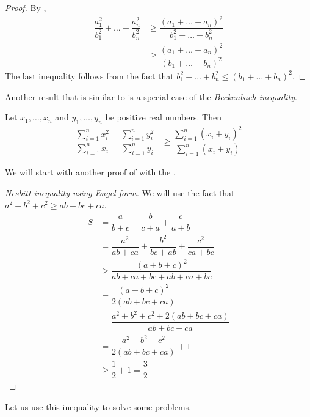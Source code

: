 \documentclass{subfile}
\begin{document}
		\begin{proof}
			By ,
				\begin{align*}
					\dfrac{a_1^2}{b_1^2}+\ldots+\dfrac{a_n^2}{b_n^2}
						& \geq\dfrac{(a_1+\ldots+a_n)^2}{b_1^2+\ldots+b_n^2}\\
						& \geq\dfrac{(a_1+\ldots+a_n)^2}{(b_1+\ldots+b_n)^2}
				\end{align*}
			The last inequality follows from the fact that $b_1^2+\ldots+b_n^2\leq(b_1+\ldots+b_n)^2$.
		\end{proof}
	Another result that is similar to  is a special case of the \textit{Beckenbach inequality}.
		\begin{theorem}
			Let $x_{1},\ldots,x_{n}$ and $y_{1},\ldots,y_{n}$ be positive real numbers. Then
				\begin{align*}
					\dfrac{\sum\limits_{i=1}^{n}x_{i}^{2}}{\sum\limits_{i=1}^{n}x_{i}}+\dfrac{\sum\limits_{i=1}^{n}y_{i}^{2}}{\sum\limits_{i=1}^{n}y_{i}}
						& \geq \dfrac{\sum\limits_{i=1}^{n}(x_{i}+y_{i})^{2}}{\sum\limits_{i=1}^{n}(x_{i}+y_{i})}
				\end{align*}
		\end{theorem}
	We will start with another proof of  with the .
		\begin{proof}[Nesbitt inequality using Engel form]
			We will use the fact that $a^2+b^2+c^2\geq ab+bc+ca$.
				\begin{align*}
					S
						& = \dfrac{a}{b+c}+\dfrac{b}{c+a}+\dfrac{c}{a+b}\\
						& = \dfrac{a^2}{ab+ca}+\dfrac{b^2}{bc+ab}+\dfrac{c^2}{ca+bc}\\
						& \geq\dfrac{(a+b+c)^2}{ab+ca+bc+ab+ca+bc}\\
						& = \dfrac{(a+b+c)^2}{2(ab+bc+ca)}\\
						& = \dfrac{a^2+b^2+c^2+2(ab+bc+ca)}{ab+bc+ca}\\
						& = \dfrac{a^2+b^2+c^2}{2(ab+bc+ca)}+1\\
						& \geq\dfrac{1}{2}+1=\dfrac{3}{2}
				\end{align*}
		\end{proof}
	Let us use this inequality to solve some problems.
\end{document}
